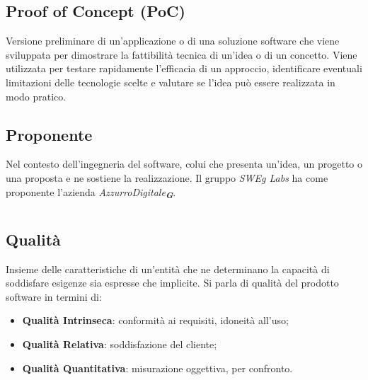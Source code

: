 \hypertarget{sec:PoC}{}
\subsection*{Proof of Concept (PoC)}
Versione preliminare di un’applicazione o di una soluzione software che viene sviluppata per dimostrare la fattibilità tecnica di un’idea o di un concetto. 
Viene utilizzata per testare rapidamente l’efficacia di un approccio, identificare eventuali limitazioni delle tecnologie scelte e valutare se l’idea può 
essere realizzata in modo pratico.

\hypertarget{sec:proponente}{}
\subsection*{Proponente}
Nel contesto dell’ingegneria del software, colui che presenta un’idea, un progetto o una proposta e ne sostiene la realizzazione. Il gruppo \emph{SWEg Labs} 
ha come proponente l’azienda \emph{AzzurroDigitale}\textsubscript{\textit{\textbf{G}}}.

\newpage



\section{}

\hypertarget{sec:Qualità}{}
\subsection*{Qualità}
Insieme delle caratteristiche di un’entità che ne determinano la capacità di soddisfare esigenze sia espresse che implicite. Si parla di qualità del prodotto software in termini di:
\begin{itemize}
    \item \textbf{Qualità Intrinseca}: conformità ai requisiti, idoneità all’uso;
    \item \textbf{Qualità Relativa}: soddisfazione del cliente;
    \item \textbf{Qualità Quantitativa}: misurazione oggettiva, per confronto.
\end{itemize}


\newpage



\section{}

